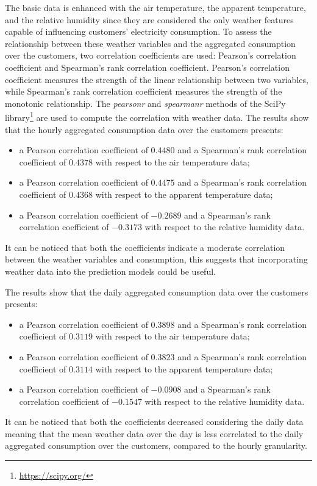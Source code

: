The basic data is enhanced with the air temperature, the apparent temperature, and the relative humidity since they are considered the only weather features capable of influencing customers' electricity consumption.
To assess the relationship between these weather variables and the aggregated consumption over the customers, two correlation coefficients are used: Pearson's correlation coefficient and Spearman's rank correlation coefficient.
Pearson's correlation coefficient measures the strength of the linear relationship between two variables, while Spearman's rank correlation coefficient measures the strength of the monotonic relationship.
The \emph{pearsonr} and \emph{spearmanr} methods of the SciPy library\footnote{ \url{https://scipy.org/} } are used to compute the correlation with weather data.
The results show that the hourly aggregated consumption data over the customers presents:
\begin{itemize}
  \item a Pearson correlation coefficient of $0.4480$ and a Spearman's rank correlation coefficient of $0.4378$ with respect to the air temperature data;
  \item a Pearson correlation coefficient of $0.4475$ and a Spearman's rank correlation coefficient of $0.4368$ with respect to the apparent temperature data;
  \item a Pearson correlation coefficient of $-0.2689$ and a Spearman's rank correlation coefficient of $-0.3173$ with respect to the relative humidity data.
\end{itemize}
It can be noticed that both the coefficients indicate a moderate correlation between the weather variables and consumption, this suggests that incorporating weather data into the prediction models could be useful.

The results show that the daily aggregated consumption data over the customers presents:
\begin{itemize}
  \item a Pearson correlation coefficient of $0.3898$ and a Spearman's rank correlation coefficient of $0.3119$ with respect to the air temperature data;
  \item a Pearson correlation coefficient of $0.3823$ and a Spearman's rank correlation coefficient of $0.3114$ with respect to the apparent temperature data;
  \item a Pearson correlation coefficient of $-0.0908$ and a Spearman's rank correlation coefficient of $-0.1547$ with respect to the relative humidity data.
\end{itemize}
It can be noticed that both the coefficients decreased considering the daily data meaning that the mean weather data over the day is less correlated to the daily aggregated consumption over the customers, compared to the hourly granularity.

